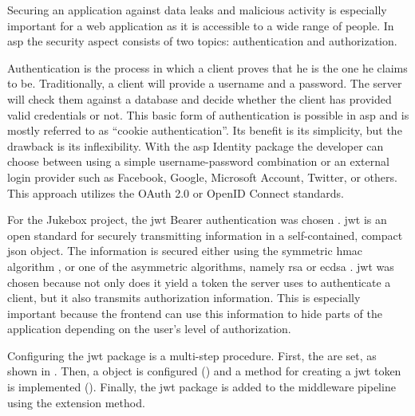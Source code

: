 Securing an application against data leaks and malicious activity is especially important for a web application as it is accessible to a wide range of people. In \gls{asp} the security aspect consists of two topics: authentication and authorization.


Authentication is the process in which a client proves that he is the one he claims to be. Traditionally, a client will provide a username and a password. The server will check them against a database and decide whether the client has provided valid credentials or not. This basic form of authentication is possible in \gls{asp} and is mostly referred to as \enquote{cookie authentication}. Its benefit is its simplicity, but the drawback is its inflexibility. With the \gls{asp} Identity package the developer can choose between using a simple username-password combination or an external login provider such as Facebook, Google, Microsoft Account, Twitter, or others. This approach utilizes the OAuth 2.0 \cite{oauth2} or OpenID Connect \cite{openID} standards. \cite{identityStorageProviders}



For the Jukebox project, the \gls{jwt} Bearer authentication was chosen \cite{jwt}. \gls{jwt} is an open standard for securely transmitting information in a self-contained, compact \gls{json} object. The information is secured either using the symmetric \gls{hmac} algorithm \cite{hmac}, or one of the asymmetric algorithms, namely \gls{rsa} or \gls{ecdsa} \cite{ecdsa}. \gls{jwt} was chosen because not only does it yield a token the server uses to authenticate a client, but it also transmits authorization information. This is especially important because the frontend can use this information to hide parts of the application depending on the user's level of authorization.

Configuring the \gls{jwt} package is a multi-step procedure. First, the  are set, as shown in . Then, a  object is configured () and a method for creating a \gls{jwt} token is implemented (). Finally, the \gls{jwt} package is added to the middleware pipeline using the  extension method.

